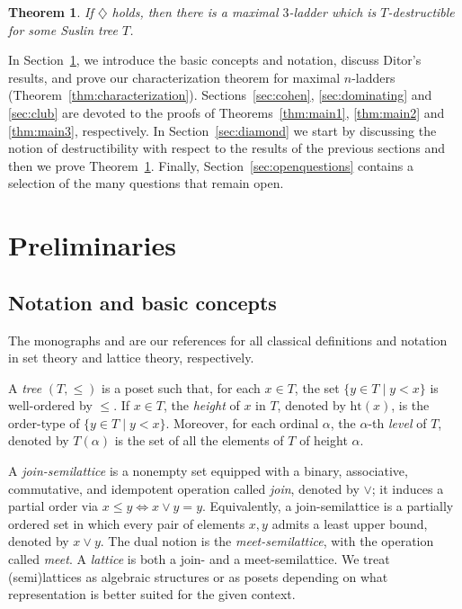 \documentclass[]{amsart}
\newtheorem{maintheorem}{Theorem}
\theoremstyle{definition}
\theoremstyle{remark}
\begin{document}
\begin{maintheorem}\label{thm:main4}
If $\diamondsuit$ holds, then there is a maximal $3$-ladder which is $T$-destructible for some Suslin tree $T$.
\end{maintheorem}

In Section~\ref{sec:prel}, we introduce the basic concepts and notation, discuss Ditor’s results, and prove our characterization theorem for maximal $n$-ladders (Theorem~\ref{thm:characterization}). Sections~\ref{sec:cohen}, \ref{sec:dominating} and \ref{sec:club} are devoted to the proofs of Theorems~\ref{thm:main1}, \ref{thm:main2} and \ref{thm:main3}, respectively. In Section~\ref{sec:diamond} we start by discussing the notion of destructibility with respect to the results of the previous sections and then we prove Theorem~\ref{thm:main4}. Finally, Section~\ref{sec:openquestions} contains a selection of the many questions that remain open.



\section{Preliminaries}\label{sec:prel}

\subsection{Notation and basic concepts}
The monographs \cite{MR1940513} and \cite{MR2768581} are our references for all classical definitions and notation in set theory and lattice theory, respectively. 

A \emph{tree} $(T, \le)$ is a poset such that, for each $x \in T$, the set $\{y \in T \mid y < x\}$ is well-ordered by $\le$. If $x \in T$, the \emph{height} of $x$ in $T$, denoted by $\mathrm{ht}(x)$, is the order-type of $\{y \in T \mid y < x\}$. Moreover, for each ordinal $\alpha$, the $\alpha$-th \emph{level} of $T$, denoted by $T(\alpha)$ is the set of all the elements of $T$ of height $\alpha$. 

A \emph{join-semilattice} is a nonempty set equipped with a binary, associative, commutative, and idempotent operation called \emph{join}, denoted by $\vee$; it induces a partial order via $x \le y \iff x \vee y = y$. Equivalently, a join-semilattice is a partially ordered set in which every pair of elements $x,y$ admits a least upper bound, denoted by $x \vee y$. The dual notion is the \emph{meet-semilattice}, with the operation called \emph{meet}. A \emph{lattice} is both a join- and a meet-semilattice. We treat (semi)lattices as algebraic structures or as posets depending on what representation is better suited for the given context. 
\end{document}
